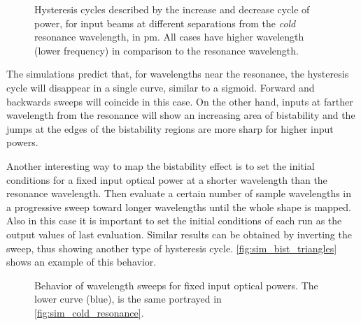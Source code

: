 \begin{figure}[ht]
	\centering
%	
%	
	
	\caption{
		Hysteresis cycles described by the increase and decrease cycle of power, for input beams at different separations from the \textit{cold} resonance wavelength, in \si{\pm}.
		All cases have higher wavelength (lower frequency) in comparison to the resonance wavelength.
	}
	\label{fig:sim_bist_cycle}
\end{figure}

The simulations predict that, for wavelengths near the resonance, the hysteresis cycle will disappear in a single curve, similar to a sigmoid.
Forward and backwards sweeps will coincide in this case.
On the other hand, inputs at farther wavelength from the resonance will show an increasing area of bistability and the jumps at the edges of the bistability regions are more sharp for higher input powers.

Another interesting way to map the bistability effect is to set the initial conditions for a fixed input optical power at a shorter wavelength than the resonance wavelength.
Then evaluate a certain number of sample wavelengths in a progressive sweep toward longer wavelengths until the whole shape is mapped.
Also in this case it is important to set the initial conditions of each run as the output values of last evaluation.
Similar results can be obtained by inverting the sweep, thus showing another type of hysteresis cycle.
\autoref{fig:sim_bist_triangles} shows an example of this behavior.

\begin{figure}[ht]
	\centering
	
	\caption{Behavior of wavelength sweeps for fixed input optical powers. The lower curve (blue), is the same portrayed in \autoref{fig:sim_cold_resonance}. }
	\label{fig:sim_bist_triangles}
\end{figure}